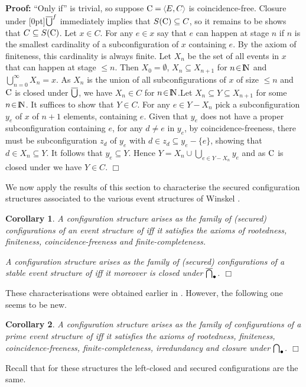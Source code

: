 \documentclass[twocolumn]{article}
\newtheorem{coro}{Corollary}
\newenvironment{corollary}[1]{\begin{coro} \rm \label{cor-#1} }{\end{coro}}
\newenvironment{proof}{\begin{trivlist} \item[\hspace{\labelsep}\bf
Proof:]}{\hfill $\Box$\end{trivlist}}
\newcommand{\dl}[1]{\mbox{\rm I\hspace{-0.75mm}#1}}     \newcommand{\dc}[1]{\mbox{\rm {\raisebox{.4ex}{\makebox [0pt][l]{\hspace{.2em}\scriptsize $\mid$}}}#1}}
\newcommand{\IN}{\dl{N}}                        \newcommand{\IQ}{\dc{Q}}                        \newcommand{\IC}{\dc{C}}                        \newcommand{\IE}{\dl{E}}                        \newcommand{\IG}{\dc{G}}                        \newcommand{\fC}{{\cal C}}                      \newcommand{\fE}{{\cal E}}                      \newcommand{\fG}{{\cal G}}                      \newcommand{\fN}{{\cal N}}                      \newcommand{\fF}{{\cal F}}                      \newcommand{\fL}{{\cal L}}                      \newcommand{\fM}{{\cal M}}                      \newcommand{\fS}{{\cal S}}                      \newcommand{\fR}{{\cal R}}                      \newcommand{\eC}{{\rm C}}                       \newcommand{\eD}{{\rm D}}                       \newcommand{\eE}{{\rm E}}                       \newcommand{\eF}{{\rm F}}                       \newcommand{\eG}{{\rm G}}                       \newcommand{\eH}{{\rm H}}                       \newcommand{\eK}{{\rm K}}                       \newcommand{\eL}{{\rm L}}                       \newcommand{\eN}{{\rm N}}                       \newcommand{\eP}{{\rm P}}                       \newcommand{\eM}{{\rm M}}                       \newcommand{\eT}{{\rm T}}                       \newcommand{\fT}{{\cal T}}
\begin{document}
\begin{proof}
``Only if'' is trivial, so suppose $\eC=\tuple{E,C}$ is
coincidence-free. Closure under \raisebox{-2pt}[0pt]{$\overline{\bigcup}^f$}
immediately implies that $S(\eC)\subseteq C$, so it remains to be
shows that $C\subseteq S(\eC)$.  Let $x \in C$. For any $e\in x$ say
that $e$ can happen at stage $n$ if $n$ is the smallest cardinality of
a subconfiguration of $x$ containing $e$. By the axiom of finiteness,
this cardinality is always finite. Let $X_n$ be the set of all events
in $x$ that can happen at stage $\leq\! n$. Then $X_0 =\emptyset$,
$X_n \subseteq X_{n+1}$ for $n\!\in\!\IN$ and $\bigcup_{n=0}^\infty
X_n = x$.  As $X_n$ is the union of all subconfigurations of $x$ of
size $\leq\!n$ and $\eC$ is closed under $\overline{\bigcup}$, we have
$X_n\!\in\! C$ for $n\!\in\!\IN$.\linebreak[3] Let $X_n \subseteq Y
\subseteq X_{n+1}$ for some $n\!\in\!\IN$.  It suffices to show that
$Y \in C$. For any \mbox{$e\in Y-X_n$} pick a subconfiguration $y_e$
of $x$ of $n+1$ elements, containing $e$.  Given that $y_e$ does not
have a proper subconfiguration containing $e$, for any $d\neq e$ in
$y_e$, by coincidence-freeness, there must be subconfiguration $z_d$
of $y_e$ with $d\in z_d \subseteq y_e-\{e\}$, showing that $d\in X_n
\subseteq Y$. It follows that $y_e\subseteq Y$.  Hence $Y = X_n \cup
\bigcup_{e\in Y-X_n} y_e$ and as $\eC$ is closed under \plat{\bbigcup}
we have $Y\in C$.
\end{proof}
We now apply the results of this section to characterise the secured
configuration structures associated to the various event structures of
{\sc Winskel} \cite{Wi87a,Wi89}.

\begin{corollary}{characterisation-Wi87a}
A configuration structure arises as the family of (secured)
configurations of an event structure of \cite{Wi87a} iff it satisfies
the axioms of rootedness, finiteness, coincidence-freeness and
finite-completeness.

A configuration structure arises as the family of (secured)
configurations of a stable event structure of \cite{Wi87a} iff it
moreover is closed under $\overline{\bigcap}_{\bullet}$.
\hfill $\Box$
\end{corollary}
These characterisations were obtained earlier in \cite{Wi87a}.
However, the following one seems to be new.

\begin{corollary}{characterisation-prime-Wi87a}
A configuration structure arises as the family of configurations of a
prime event structure of \cite{Wi87a} iff it satisfies
the axioms of rootedness, finiteness, coincidence-freeness,
finite-completeness, irredundancy and closure under $\bigcap_{\bullet}$.
\hfill $\Box$
\end{corollary}
Recall that for these structures the left-closed and secured
configurations are the same.
\end{document}
